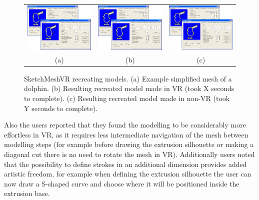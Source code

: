 \begin{figure}[!h]
    \centering
    \setlength{\tabcolsep}{0.0130\linewidth}
    \begin{tabular}{@{}ccc@{}}
    \includegraphics[width=0.3\linewidth]{figures/voldiff_ui}&
  	\includegraphics[width=0.3\linewidth]{figures/voldiff_ui}&
  	\includegraphics[width=0.3\linewidth]{figures/voldiff_ui}\\

    (a)&(b)&(c)\\
    \end{tabular}
    \caption[SketchMeshVR dolphin model]{SketchMeshVR recreating models.
    	  \textup{(a)} Example simplified mesh of a dolphin.
	  \textup{(b)} Resulting recreated model made in VR (took X seconds to complete).
	  \textup{(c)} Resulting recreated model made in non-VR (took Y seconds to complete).
      \label{fig:recreate_dolphin}}
\end{figure}


Also the users reported that they found the modelling to be considerably more effortless in VR, as it requires less intermediate navigation of the mesh between modelling steps (for example before drawing the extrusion silhouette or making a diagonal cut there is no need to rotate the mesh in VR). 
Additionally users noted that the possibility to define strokes in an additional dimension provides added artistic freedom, for example when defining the extrusion silhouette the user can now draw a S-shaped curve and choose where it will be positioned inside the extrusion base. 
